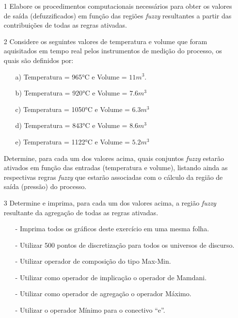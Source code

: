 \documentclass{report}
\begin{document}
\begin{enumerate}

\item[1] Elabore os procedimentos computacionais necessários para obter os valores de saída
(defuzzificados) em função das regiões \emph{fuzzy} resultantes a partir das contribuições de todas as
regras ativadas.

\item[2]  Considere os seguintes valores de temperatura e volume que foram aquisitados em tempo real
pelos instrumentos de medição do processo, os quais são definidos por:

\begin{enumerate}
\item[a)] Temperatura = 965°C e Volume = $11m^3$.
\item[b)] Temperatura = 920°C e Volume = $7.6m^3$
\item[c)] Temperatura = 1050°C e Volume = $6.3m^3$
\item[d)] Temperatura = 843°C e Volume = $8.6m^3$
\item[e)] Temperatura = 1122°C e Volume = $5.2m^3$
\end{enumerate}

Determine, para cada um dos valores acima, quais conjuntos \emph{fuzzy} estarão ativados em função
das entradas (temperatura e volume), listando ainda as respectivas regras \emph{fuzzy} que estarão
associadas com o cálculo da região de saída (pressão) do processo.


\item[3]  Determine e imprima, para cada um dos valores acima, a região \emph{fuzzy} resultante da agregação
de todas as regras ativadas.

\begin{enumerate}
\small
\item[-] Imprima todos os gráficos deste exercício em uma mesma folha.
\item[-] Utilizar 500 pontos de discretização para todos os universos de discurso.
\item[-] Utilizar operador de composição do tipo Max-Min.
\item[-] Utilizar como operador de implicação o operador de Mamdani.
\item[-] Utilizar como operador de agregação o operador Máximo.
\item[-] Utilizar o operador Mínimo para o conectivo “e”.
\end{enumerate}




\end{enumerate}
\end{document}
